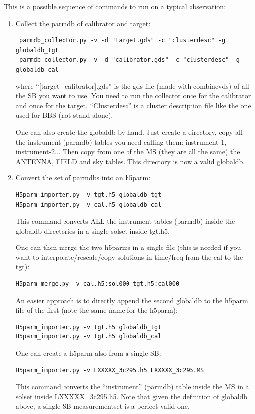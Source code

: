 \documentclass[]{article}
\begin{document}
This is a possible sequence of commands to run \losoto{} on a typical observation:
\begin{enumerate}

\item Collect the parmdb of calibrator and target:
\begin{verbatim}
 parmdb_collector.py -v -d "target.gds" -c "clusterdesc" -g globaldb_tgt
 parmdb_collector.py -v -d "calibrator.gds" -c "clusterdesc" -g globaldb_cal
\end{verbatim}
where ``[target \textbar\ calibrator].gds'' is the gds file (made with combinevds) of all the SB you want to use. You need to run the collector once for the calibrator and once for the target. ``Clusterdesc'' is a cluster description file like the one used for BBS (not stand-alone).

One can also create the globaldb by hand. Just create a directory, copy all the instrument (parmdb) tables you need calling them: instrument-1, instrument-2... Then copy from one of the MS (they are all the same) the ANTENNA, FIELD and sky tables. This directory is now a valid globaldb.

\item Convert the set of parmdbs into an h5parm:
\begin{verbatim}
H5parm_importer.py -v tgt.h5 globaldb_tgt
H5parm_importer.py -v cal.h5 globaldb_cal
\end{verbatim}
This command converts ALL the instrument tables (parmdb) inside the globaldb directories in a single solset inside tgt.h5.

One can then merge the two h5parms in a single file (this is needed if you want to interpolate/rescale/copy solutions in time/freq from the cal to the tgt):
\begin{verbatim}
H5parm_merge.py -v cal.h5:sol000 tgt.h5:cal000
\end{verbatim}

An easier approach is to directly append the second globaldb to the h5parm file of the first (note the same name for the h5parm):
\begin{verbatim}
H5parm_importer.py -v tgt.h5 globaldb_tgt
H5parm_importer.py -v tgt.h5 globaldb_cal
\end{verbatim}

One can create a h5parm also from a single SB:
\begin{verbatim}
H5parm_importer.py -v LXXXXX_3c295.h5 LXXXXX_3c295.MS
\end{verbatim}
This command converts the ``instrument'' (parmdb) table inside the MS in a solset inside LXXXXX\_3c295.h5. Note that given the definition of globaldb above, a single-SB measurementset is a perfect valid one.


\end{enumerate}
\end{document}
